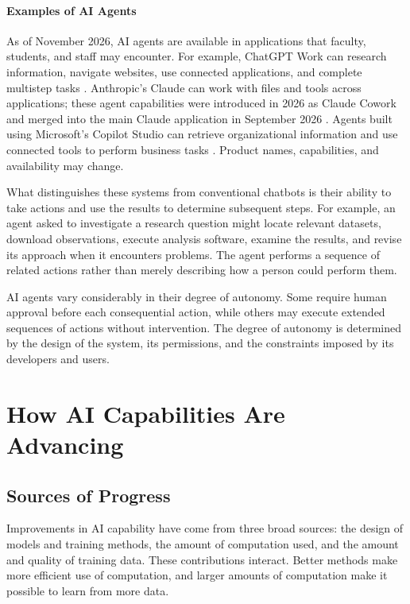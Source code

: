 \documentclass[11pt]{article}
\begin{document}
\paragraph{Examples of AI Agents}
As of November 2026, AI agents are available in applications that faculty, students, and staff may encounter. For example, ChatGPT Work can research information, navigate websites, use connected applications, and complete multistep tasks \citep{OpenAI2026Work}.
Anthropic's Claude can work with files and tools across applications; these agent capabilities were introduced in 2026 as Claude Cowork and merged into the main Claude application in September 2026
\citep{Anthropic2026Cowork}.
Agents built using Microsoft's Copilot Studio can retrieve organizational information and use connected tools to perform business tasks \citep{Microsoft2026CopilotStudio}. Product names, capabilities, and availability may change.

What distinguishes these systems from conventional chatbots is their ability to take actions and use the results to determine subsequent steps. For example, an agent asked to investigate a research question might locate relevant datasets, download observations, execute analysis software, examine the results, and revise its approach when it encounters problems. The agent performs a sequence of related actions rather than merely describing how a person could perform them.

AI agents vary considerably in their degree of autonomy.
Some require human approval before each consequential action,
while others may execute extended sequences of actions
without intervention. The degree of autonomy is determined
by the design of the system, its permissions, and the
constraints imposed by its developers and users.

\FloatBarrier
\section{How AI Capabilities Are Advancing}\label{sec:progress}

\subsection{Sources of Progress}

Improvements in AI capability have come from three broad sources: the design of models and training methods, the amount of computation used, and the amount and quality of training data. These contributions interact. Better methods make more efficient use of computation, and larger amounts of computation make it possible to learn from more data.
\end{document}
